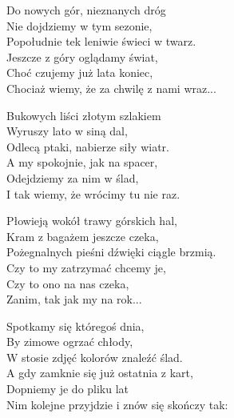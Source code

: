\begin{text}
    \ifchorded{\hfill\break}
    Do nowych gór, nieznanych dróg\\
    Nie dojdziemy w tym sezonie,\\
    Popołudnie tek leniwie świeci w twarz.\\
    Jeszcze z góry oglądamy świat,\\
    Choć czujemy już lata koniec,\\
    Chociaż wiemy, że za chwilę z nami wraz...

    \vin Bukowych liści złotym szlakiem\\
    \vin Wyruszy lato w siną dal,\\
    \vin Odlecą ptaki, nabierze siły wiatr.\\
    \vin A my spokojnie, jak na spacer,\\
    \vin Odejdziemy za nim w ślad,\\
    \vin I tak wiemy, że wrócimy tu nie raz.

    Płowieją wokół trawy górskich hal,\\
    Kram z bagażem jeszcze czeka,\\
    Pożegnalnych pieśni dźwięki ciągle brzmią.\\
    Czy to my zatrzymać chcemy je,\\
    Czy to ono na nas czeka,\\
    Zanim, tak jak my na rok...

    Spotkamy się któregoś dnia,\\
    By zimowe ogrzać chłody,\\
    W stosie zdjęć kolorów znaleźć ślad.\\
    A gdy zamknie się już ostatnia z kart,\\
    Dopniemy je do pliku lat\\
    Nim kolejne przyjdzie i znów się skończy tak:
\end{text}
